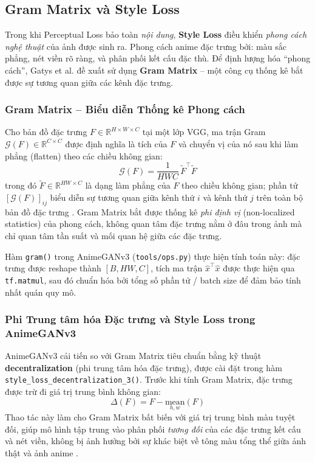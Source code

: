 \subsection{Gram Matrix và Style Loss}
\label{subsec:gram_style_loss}

Trong khi Perceptual Loss bảo toàn \textit{nội dung}, \textbf{Style Loss} điều khiển
\textit{phong cách nghệ thuật} của ảnh được sinh ra. Phong cách anime đặc trưng bởi: màu sắc
phẳng, nét viền rõ ràng, và phân phối kết cấu đặc thù. Để định lượng hóa ``phong cách'',
Gatys et al. \cite{Gatys2016} đề xuất sử dụng \textbf{Gram Matrix} -- một công cụ thống kê
bắt được sự tương quan giữa các kênh đặc trưng.

\subsubsection{Gram Matrix -- Biểu diễn Thống kê Phong cách}
\label{subsubsec:gram_matrix}

Cho bản đồ đặc trưng $F \in \mathbb{R}^{H \times W \times C}$ tại một lớp VGG, ma trận Gram
$\mathcal{G}(F) \in \mathbb{R}^{C \times C}$ được định nghĩa là tích của $F$ và chuyển vị của
nó sau khi làm phẳng (flatten) theo các chiều không gian:
\begin{equation}
\label{eq:gram_matrix}
\mathcal{G}(F) = \frac{1}{HWC} \, \tilde{F}^\top \tilde{F}
\end{equation}
trong đó $\tilde{F} \in \mathbb{R}^{HW \times C}$ là dạng làm phẳng của $F$ theo chiều không
gian; phần tử $[\mathcal{G}(F)]_{ij}$ biểu diễn sự tương quan giữa kênh thứ $i$ và kênh thứ
$j$ trên toàn bộ bản đồ đặc trưng \cite{Gatys2016}. Gram Matrix bắt được thống kê
\textit{phi định vị} (non-localized statistics) của phong cách, không quan tâm đặc trưng nằm
ở đâu trong ảnh mà chỉ quan tâm tần suất và mối quan hệ giữa các đặc trưng.

Hàm \texttt{gram()} trong AnimeGANv3 (\texttt{tools/ops.py}) thực hiện tính toán này:
đặc trưng được reshape thành $[B, HW, C]$, tích ma trận $\hat{x}^\top \hat{x}$ được thực hiện
qua \texttt{tf.matmul}, sau đó chuẩn hóa bởi tổng số phần tử / batch size để đảm bảo tính
nhất quán quy mô.

\subsubsection{Phi Trung tâm hóa Đặc trưng và Style Loss trong AnimeGANv3}
\label{subsubsec:style_loss_formula}

AnimeGANv3 cải tiến so với Gram Matrix tiêu chuẩn bằng kỹ thuật \textbf{decentralization}
(phi trung tâm hóa đặc trưng), được cài đặt trong hàm \texttt{style\_loss\_decentralization\_3()}.
Trước khi tính Gram Matrix, đặc trưng được trừ đi giá trị trung bình không gian:
\begin{equation}
\label{eq:decentralization}
\Delta(F) = F - \underset{h,w}{\mathrm{mean}}(F)
\end{equation}
Thao tác này làm cho Gram Matrix bất biến với giá trị trung bình màu tuyệt đối, giúp mô hình
tập trung vào phân phối \textit{tương đối} của các đặc trưng kết cấu và nét viền, không bị
ảnh hưởng bởi sự khác biệt về tông màu tổng thể giữa ảnh thật và ảnh anime \cite{Liu2024}.

